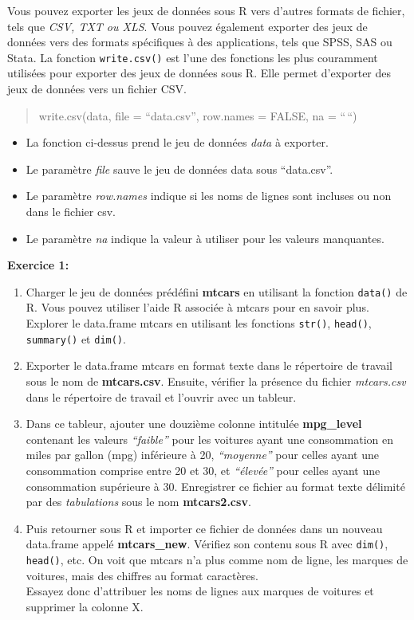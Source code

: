 \documentclass[
]{article}
\providecommand{\tightlist}{%
  \setlength{\itemsep}{0pt}\setlength{\parskip}{0pt}}
\begin{document}
Vous pouvez exporter les jeux de données sous R vers d'autres formats de fichier, tels que \emph{CSV, TXT ou XLS}. Vous pouvez également exporter des jeux de données vers des formats spécifiques à des applications, tels que SPSS, SAS ou Stata. La fonction \texttt{write.csv()} est l'une des fonctions les plus couramment utilisées pour exporter des jeux de données sous R. Elle permet d'exporter des jeux de données vers un fichier CSV.

\begin{quote}
write.csv(data, file = ``data.csv'', row.names = FALSE, na = ``\,``)
\end{quote}

\begin{itemize}
\tightlist
\item
  La fonction ci-dessus prend le jeu de données \emph{data} à exporter.\\
\item
  Le paramètre \emph{file} sauve le jeu de données data sous ``data.csv''.\\
\item
  Le paramètre \emph{row.names} indique si les noms de lignes sont incluses ou non dans le fichier csv.\\
\item
  Le paramètre \emph{na} indique la valeur à utiliser pour les valeurs manquantes.
\end{itemize}

\textbf{Exercice 1:}

\begin{enumerate}
\def\labelenumi{\arabic{enumi}.}
\tightlist
\item
  Charger le jeu de données prédéfini \textbf{mtcars} en utilisant la fonction \texttt{data()} de R. Vous pouvez utiliser l'aide R associée à mtcars pour en savoir plus. Explorer le data.frame mtcars en utilisant les fonctions \texttt{str()}, \texttt{head()}, \texttt{summary()} et \texttt{dim()}.
\item
  Exporter le data.frame mtcars en format texte dans le répertoire de travail sous le nom de \textbf{mtcars.csv}. Ensuite, vérifier la présence du fichier \emph{mtcars.csv} dans le répertoire de travail et l'ouvrir avec un tableur.
\item
  Dans ce tableur, ajouter une douzième colonne intitulée \textbf{mpg\_level} contenant les valeurs \emph{``faible''} pour les voitures ayant une consommation en miles par gallon (mpg) inférieure à 20, \emph{``moyenne''} pour celles ayant une consommation comprise entre 20 et 30, et \emph{``élevée''} pour celles ayant une consommation supérieure à 30. Enregistrer ce fichier au format texte délimité par des \emph{tabulations} sous le nom \textbf{mtcars2.csv}.
\item
  Puis retourner sous R et importer ce fichier de données dans un nouveau data.frame appelé \textbf{mtcars\_new}. Vérifiez son contenu sous R avec \texttt{dim()}, \texttt{head()}, etc. On voit que mtcars n'a plus comme nom de ligne, les marques de voitures, mais des chiffres au format caractères.\\
  Essayez donc d'attribuer les noms de lignes aux marques de voitures et supprimer la colonne X.
\end{enumerate}
\end{document}
